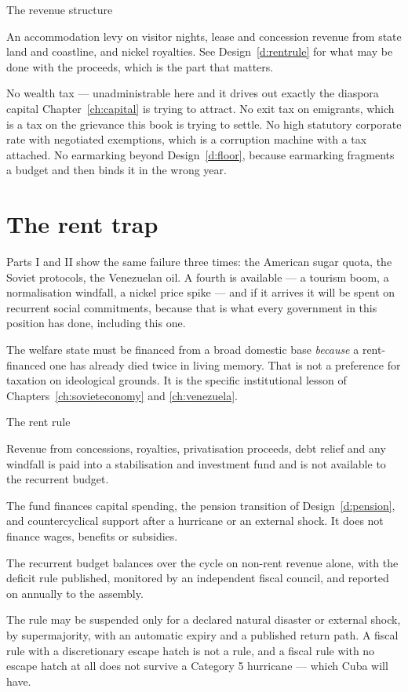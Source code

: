 \begin{design}{The revenue structure}
\begin{rules}
 An accommodation levy on visitor nights, lease
and concession revenue from state land and coastline, and nickel royalties. See
Design~\ref{d:rentrule} for what may be done with the proceeds, which is the
part that matters.

 No wealth tax --- unadministrable here and it drives
out exactly the diaspora capital Chapter~\ref{ch:capital} is trying to attract.
No exit tax on emigrants, which is a tax on the grievance this book is trying to
settle. No high statutory corporate rate with negotiated exemptions, which is a
corruption machine with a tax attached. No earmarking beyond
Design~\ref{d:floor}, because earmarking fragments a budget and then binds it in
the wrong year.
\end{rules}
\end{design}

\section{The rent trap}

Parts I and II show the same failure three times: the American sugar quota, the
Soviet protocols, the Venezuelan oil. A fourth is available --- a tourism boom,
a normalisation windfall, a nickel price spike --- and if it arrives it will be
spent on recurrent social commitments, because that is what every government in
this position has done, including this one.

The welfare state must be financed from a broad domestic base \emph{because} a
rent-financed one has already died twice in living memory. That is not a
preference for taxation on ideological grounds. It is the specific institutional
lesson of Chapters~\ref{ch:sovieteconomy} and \ref{ch:venezuela}.

\begin{design}{The rent rule}
\label{d:rentrule}
\begin{rules}
 Revenue from concessions, royalties, privatisation proceeds,
debt relief and any windfall is paid into a stabilisation and investment fund
and is not available to the recurrent budget.

 The fund finances capital spending, the pension
transition of Design~\ref{d:pension}, and countercyclical support after a
hurricane or an external shock. It does not finance wages, benefits or
subsidies.

 The recurrent budget balances over the cycle on non-rent revenue
alone, with the deficit rule published, monitored by an independent fiscal
council, and reported on annually to the assembly.

 The rule may be suspended only for a declared natural disaster or
external shock, by supermajority, with an automatic expiry and a published
return path. A fiscal rule with a discretionary escape hatch is not a rule, and
a fiscal rule with no escape hatch at all does not survive a Category 5
hurricane --- which Cuba will have.
\end{rules}
\end{design}


